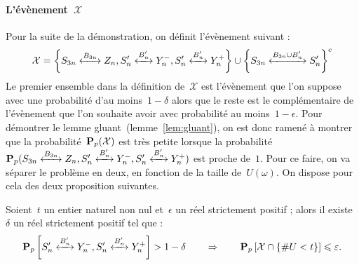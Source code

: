 		\paragraph{L'évènement~$\mathcal{X}$} Pour la suite de la démonstration, on définit l'évènement suivant :
		\unboldmath
			\[
				\mathcal{X} =
				\left\{
					\relie[B_{3n}]{S_{3n}}{Z_n},
					\relie[B_n']{S_n'}{Y_n^-},
					\relie[B_n']{S_n'}{Y_n^+}
				\right\}
				\cup
				\left\{
					\relie[B_{3n}\cup B_n']{S_{3n}}{S_n'}
				\right\}^c
			\]
			Le premier ensemble dans la définition de~$\mathcal{X}$ est l'évènement que l'on suppose avec une probabilité d'au moins~$1-\delta$ alors que le reste est le complémentaire de l'évènement que l'on souhaite avoir avec probabilité au moins~$1-\epsilon$. Pour démontrer le lemme gluant~(lemme~\ref{lem:gluant}), on est donc ramené à montrer que la probabilité~$\bm{\mathrm{P}}_{p}(\mathcal{X})$ est très petite lorsque la probabilité~$\PpSP(\relie[B_{3n}]{S_{3n}}{Z_n}, \relie[B_n']{S_n'}{Y_n^-}, \relie[B_n']{S_n'}{Y_n^+})$ est proche de~$1$. Pour ce faire, on va séparer le problème en deux, en fonction de la taille de~$U(\omega)$. On dispose pour cela des deux proposition suivantes.
			\begin{prop}\label{prop:Upetit}
				Soient~$t$ un entier naturel non nul et~$\epsilon$ un réel strictement positif ; alors il existe~$\delta$ un réel strictement positif tel que :
				\[
					\Pp{\relie[B_n']{S_n'}{Y_n^-}, \relie[B_n']{S_n'}{Y_n^+}} > 1 - \delta
						\quad\quad
						\Rightarrow
						\quad\quad
					\Pp{\mathcal{X}\cap\{\#U<t\}} \leq \epsilon.
				\]
			\end{prop}
